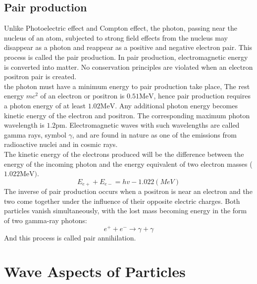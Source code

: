 \subsection{Pair production}
Unlike Photoelectric effect and Compton effect,  the photon, passing near the nucleus of an atom,  subjected to strong field effects from the nucleus  may disappear as a photon and reappear as a positive and negative electron pair. This process is called the pair production. In  pair production,  electromagnetic energy is converted into matter.  No conservation principles are violated when an electron positron pair is created.\\
the photon must have a minimum energy to pair production take place,
The rest energy $m c^{2}$ of an electron or positron is $0.51 \mathrm{MeV}$, hence pair production requires a photon energy of at least $1.02 \mathrm{MeV}$. Any additional photon energy becomes kinetic energy of the electron and positron. The corresponding maximum photon wavelength is $1.2 \mathrm{pm}$. Electromagnetic waves with such wavelengths are called gamma rays, symbol $\gamma$, and are found in nature as one of the emissions from radioactive nuclei and in cosmic rays. \\
The kinetic energy of the electrons produced will be the difference between the energy of the incoming photon and the energy equivalent of two electron masses (  $1.022 \mathrm{MeV})$.
$$
{E}_{{e}+}+{E}_{{e}-}={h} v-{1 . 0 2 2}({M e V})
$$
The inverse of pair production occurs when a positron is near an electron and the two come together under the influence of their opposite electric charges. Both particles vanish simultaneously, with the lost mass becoming energy in the form of two gamma-ray photons:
$$
e^{+}+e^{-} \rightarrow \gamma+\gamma
$$
And this process is called pair annihilation.
\section{Wave Aspects of Particles}
